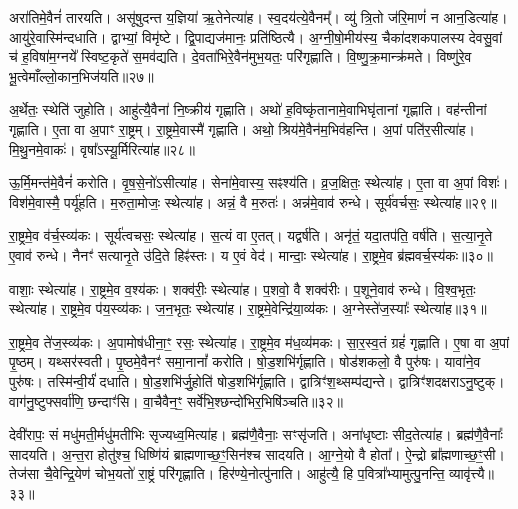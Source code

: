 अरा॑तिमे॒वैनं॑ तारयति।
असू॑षुदन्त य॒ज्ञिया॑ ऋ॒तेनेत्या॑ह।
स्व॒दय॑त्ये॒वैनम्᳚।
व्यु॑ त्रि॒तो ज॑रि॒माणं॑ न आन॒डित्या॑ह।
आयु॑रे॒वास्मि॑न्दधाति।
द्वाभ्यां॒ विमृ॑ष्टे।
द्वि॒पाद्यज॑मानः॒ प्रति॑\-ष्ठित्यै।
अ॒ग्नी॒षो॒मीय॑स्य॒ चैका॑\-दश\-कपालस्य देवसु॒वां च॑ ह॒विषा॑म॒ग्नये᳚ स्विष्ट॒कृते॑ स॒मव॑द्यति।
दे॒वता॑भिरे॒वैन॑मुभ॒यतः॒ परि॑गृह्णाति।
वि॒ष्णु॒क्र॒मान्क्र॑मते।
विष्णु॑रे॒व भू॒त्वेमाँल्लो॒कान॒भि\-ज॑यति॥२७॥\ip\anuvakamend[स॒त्याना॑मधा॒यीत्या॑हातारी॒दित्या॑ह क्रमत॒ एकं॑ च]

अ॒र्थेतः॒ स्थेति॑ जुहोति।
आहु॑त्यै॒वैना॑ नि॒ष्क्रीय॑ गृह्णाति।
अथो॑ ह॒विष्कृ॑तानामे॒वाभिघृ॑तानां गृह्णाति।
वह॑न्तीनां गृह्णाति।
ए॒ता वा अ॒पाꣳ रा॒ष्ट्रम्।
रा॒ष्ट्रमे॒वास्मै॑ गृह्णाति।
अथो॒ श्रिय॑मे॒वैन॑म॒भिव॑हन्ति।
अ॒पां पति॑र॒सीत्या॑ह।
मि॒थु॒नमे॒वाकः॑।
वृषा᳚\-ऽस्यू॒र्मिरित्या॑ह॥२८॥\ip

ऊ॒र्मि॒मन्त॑मे॒वैनं॑ करोति।
वृ॒ष॒से॒नो॑\-ऽसीत्या॑ह।
सेना॑मे॒वास्य॒ सꣴश्य॑ति।
व्र॒ज॒क्षितः॒ स्थेत्या॑ह।
ए॒ता वा अ॒पां विशः॑।
विश॑मे॒वास्मै॒ पर्यू॑हति।
म॒रुता॒मोजः॒ स्थेत्या॑ह।
अन्नं॒ वै म॒रुतः॑।
अन्न॑मे॒वाव॑ रुन्धे।
सूर्य॑वर्चसः॒ स्थेत्या॑ह॥२९॥\ip

रा॒ष्ट्रमे॒व व॑र्च॒स्व्य॑कः।
सूर्य॑त्वचसः॒ स्थेत्या॑ह।
स॒त्यं वा ए॒तत्।
यद्वर्\mbox{}ष॑ति।
अनृ॑तं॒ यदा॒तप॑ति॒ वर्\mbox{}ष॑ति।
स॒त्या॒नृ॒ते ए॒वाव॑ रुन्धे।
नैनꣳ॑ सत्यानृ॒ते उ॑दि॒ते हिꣴ॑स्तः।
य ए॒वं वेद॑।
मान्दाः॒ स्थेत्या॑ह।
रा॒ष्ट्रमे॒व ब्र॑ह्म\-वर्च॒स्य॑कः॥३०॥\ip

वाशाः॒ स्थेत्या॑ह।
रा॒ष्ट्रमे॒व व॒श्य॑कः।
शक्व॑रीः॒ स्थेत्या॑ह।
प॒शवो॒ वै शक्व॑रीः।
प॒शूने॒वाव॑ रुन्धे।
वि॒श्व॒भृतः॒ स्थेत्या॑ह।
रा॒ष्ट्रमे॒व प॑य॒स्व्य॑कः।
ज॒न॒भृतः॒ स्थेत्या॑ह।
रा॒ष्ट्रमे॒वेन्द्रि॑या॒व्य॑कः।
अ॒ग्नेस्ते॑ज॒स्याः᳚ स्थेत्या॑ह॥३१॥\ip

रा॒ष्ट्रमे॒व ते॑ज॒स्व्य॑कः।
अ॒पामोष॑धीना॒ꣳ॒ रसः॒ स्थेत्या॑ह।
रा॒ष्ट्रमे॒व म॑ध॒व्य॑मकः।
सा॒र॒स्व॒तं ग्रहं॑ गृह्णाति।
ए॒षा वा अ॒पां पृ॒ष्ठम्।
यथ्सर॑स्वती।
पृ॒ष्ठमे॒वैनꣳ॑ समा॒नानां᳚ करोति।
षो॒ड॒शभि॑र्गृह्णाति।
षोड॑शकलो॒ वै पुरु॑षः।
यावा॑ने॒व पुरु॑षः।
तस्मि॑न्वी॒र्यं॑ दधाति।
षो॒ड॒शभि॑र्जु॒होति॑ षोड॒शभि॑र्गृह्णाति।
द्वात्रिꣳ॑श॒थ्सम्प॑द्यन्ते।
द्वात्रिꣳ॑शदक्षरा\-ऽनु॒ष्टुक्।
वाग॑नु॒ष्टुफ्सर्वा॑णि॒ छन्दाꣳ॑सि।
वा॒चैवैन॒ꣳ॒ सर्वे॑भि॒श्छन्दो॑भिर॒भिषि॑ञ्चति॥३२॥\ip\anuvakamend[ऊ॒र्मिरित्या॑ह॒ सूर्य॑वर्चसः॒ स्थेत्या॑ह ब्रह्मवर्च॒स्य॑कस्तेज॒स्याः᳚ स्थेत्या॑है॒व पुरु॑षः॒ षट् च॑]

देवी॑रापः॒ सं मधु॑मती॒र्मधु॑मतीभिः सृज्यध्व॒मित्या॑ह।
ब्रह्म॑णै॒वैनाः॒ सꣳसृ॑जति।
अना॑धृष्टाः सीद॒तेत्या॑ह।
ब्रह्म॑णै॒वैनाः᳚ सादयति।
अ॒न्त॒रा होतु॑श्च॒ धिष्णि॑यं ब्राह्मणाच्छ॒ꣳ॒सिन॑श्च सादयति।
आ॒ग्ने॒यो वै होता᳚।
ऐ॒न्द्रो ब्रा᳚ह्मणाच्छ॒ꣳ॒सी।
तेज॑सा चै॒वेन्द्रि॒येण॑ चोभ॒यतो॑ रा॒ष्ट्रं परि॑गृह्णाति।
हिर॑ण्ये॒नोत्पु॑नाति।
आहु॑त्यै॒ हि प॒वित्रा᳚भ्यामुत्पु॒नन्ति॒ व्यावृ॑त्त्यै॥३३॥\ip

